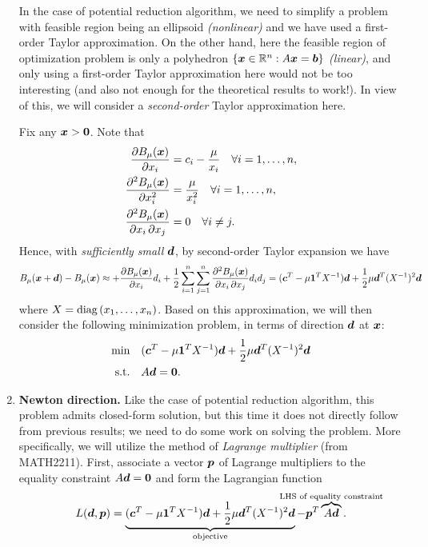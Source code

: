 \begin{enumerate}
In the case of potential reduction algorithm, we need to simplify a problem
with feasible region being an ellipsoid \emph{(nonlinear)} and we have used a
first-order Taylor approximation. On the other hand, here the feasible region
of optimization problem is only a polyhedron
\(\{\bm{x}\in\mathbb{R}^{n}:A\bm{x}=\bm{b}\}\) \emph{(linear)}, and only using a
first-order Taylor approximation here would not be too interesting (and also
not enough for the theoretical results to work!). In view of this, we will
consider a \emph{second-order} Taylor approximation here.

Fix any \(\bm{x}>\bm{0}\). Note that
\begin{align*}
\pdv{B_{\mu}(\bm{x})}{x_i}&=c_i-\frac{\mu}{x_i}\quad\forall i=1,\dotsc,n, \\
\pdv[order=2]{B_{\mu}(\bm{x})}{x_i}&=\frac{\mu}{x_i^{2}}
\quad\forall i=1,\dotsc,n, \\
\pdv{B_{\mu}(\bm{x})}{x_i,x_j}&=0\quad\forall i\ne j.
\end{align*}
Hence, with \emph{sufficiently small} \(\bm{d}\), by second-order
Taylor expansion we have
\[
B_{\mu}(\bm{x}+\bm{d})-B_{\mu}(\bm{x})\approx
+\pdv{B_{\mu}(\bm{x})}{x_i}d_i
+\frac{1}{2}\sum_{i=1}^{n}\sum_{j=1}^{n}
\pdv{B_{\mu}(\bm{x})}{x_i,x_j}d_{i}d_{j}
=(\bm{c}^{T}-\mu\bm{1}^{T}X^{-1})\bm{d}
+\frac{1}{2}\mu\bm{d}^{T}(X^{-1})^{2}\bm{d}
\]
where \(X=\operatorname{diag}\left(x_1,\dotsc,x_n\right)\). Based on this approximation, we will then
consider the following minimization problem, in terms of direction \(\bm{d}\)
at \(\bm{x}\):
\begin{align*}
\text{min}\quad&(\bm{c}^{T}-\mu\bm{1}^{T}X^{-1})\bm{d}
+\frac{1}{2}\mu\bm{d}^{T}(X^{-1})^{2}\bm{d}\\
\text{s.t.}\quad&A\bm{d}=\bm{0}.
\end{align*}
\item\label{it:newton-dir-fmla} \textbf{Newton direction.} Like the case of
potential reduction algorithm, this problem admits closed-form solution, but
this time it does not directly follow from previous results; we need to do some
work on solving the problem.  More specifically, we will utilize the method of
\emph{Lagrange multiplier} (from MATH2211). First, associate a vector
\(\bm{p}\) of Lagrange multipliers to the equality constraint
\(A\bm{d}=\bm{0}\) and form the Lagrangian function
\[
L(\vect{d},\vect{p})=
\underbrace{(\vect{c}^{T}-\mu\vect{1}^{T}X^{-1})\vect{d}
+\frac{1}{2}\mu\vect{d}^{T}(X^{-1})^{2}\vect{d}}_{\text{objective}}
-\vect{p}^{T}\overbrace{A\vect{d}}^{\mathclap{\text{LHS of equality constraint}}}.
\]
\end{enumerate}
